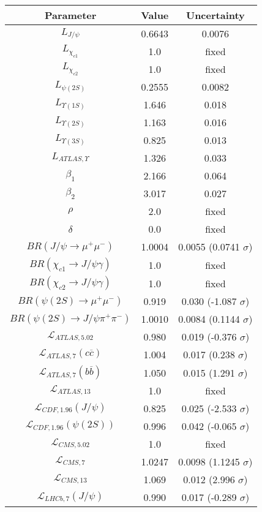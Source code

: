 \begin{table}[h!]
\centering
\begin{tabular}{c|c|c}
Parameter & Value & Uncertainty \\
\hline
$L_{J/\psi}$ & 0.6643 & 0.0076 \\
$L_{\chi_{c1}}$ & 1.0 & fixed \\
$L_{\chi_{c2}}$ & 1.0 & fixed \\
$L_{\psi(2S)}$ & 0.2555 & 0.0082 \\
$L_{\Upsilon(1S)}$ & 1.646 & 0.018 \\
$L_{\Upsilon(2S)}$ & 1.163 & 0.016 \\
$L_{\Upsilon(3S)}$ & 0.825 & 0.013 \\
$L_{ATLAS,\Upsilon}$ & 1.326 & 0.033 \\
$\beta_1$ & 2.166 & 0.064 \\
$\beta_2$ & 3.017 & 0.027 \\
$\rho$ & 2.0 & fixed \\
$\delta$ & 0.0 & fixed \\
$BR(J/\psi\rightarrow\mu^+\mu^-)$ & 1.0004 & 0.0055 (0.0741 $\sigma$) \\
$BR(\chi_{c1}\rightarrow J/\psi\gamma)$ & 1.0 & fixed \\
$BR(\chi_{c2}\rightarrow J/\psi\gamma)$ & 1.0 & fixed \\
$BR(\psi(2S)\rightarrow\mu^+\mu^-)$ & 0.919 & 0.030 (-1.087 $\sigma$) \\
$BR(\psi(2S)\rightarrow J/\psi\pi^+\pi^-)$ & 1.0010 & 0.0084 (0.1144 $\sigma$) \\
$\mathcal L_{ATLAS,5.02}$ & 0.980 & 0.019 (-0.376 $\sigma$) \\
$\mathcal L_{ATLAS,7}(c\overline c)$ & 1.004 & 0.017 (0.238 $\sigma$) \\
$\mathcal L_{ATLAS,7}(b\overline b)$ & 1.050 & 0.015 (1.291 $\sigma$) \\
$\mathcal L_{ATLAS,13}$ & 1.0 & fixed \\
$\mathcal L_{CDF,1.96}(J/\psi)$ & 0.825 & 0.025 (-2.533 $\sigma$) \\
$\mathcal L_{CDF,1.96}(\psi(2S))$ & 0.996 & 0.042 (-0.065 $\sigma$) \\
$\mathcal L_{CMS,5.02}$ & 1.0 & fixed \\
$\mathcal L_{CMS,7}$ & 1.0247 & 0.0098 (1.1245 $\sigma$) \\
$\mathcal L_{CMS,13}$ & 1.069 & 0.012 (2.996 $\sigma$) \\
$\mathcal L_{LHCb,7}(J/\psi)$ & 0.990 & 0.017 (-0.289 $\sigma$) \\

\end{tabular}
\end{table}
